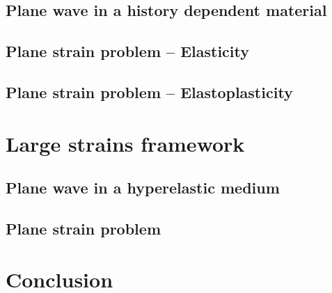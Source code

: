 \subsection{Plane wave in a history dependent material}
\label{sec:hpp_planewave}


\subsection{Plane strain problem -- Elasticity}
\label{sec:el_planestrain}

\subsection{Plane strain problem -- Elastoplasticity}
\label{sec:ep_planestrain}


\section{Large strains framework}
\label{sec:he_simulations}
\subsection{Plane wave in a hyperelastic medium}
\label{sec:he_planewave}


\subsection{Plane strain problem}
\label{sec:he_plate}




\section{Conclusion}
